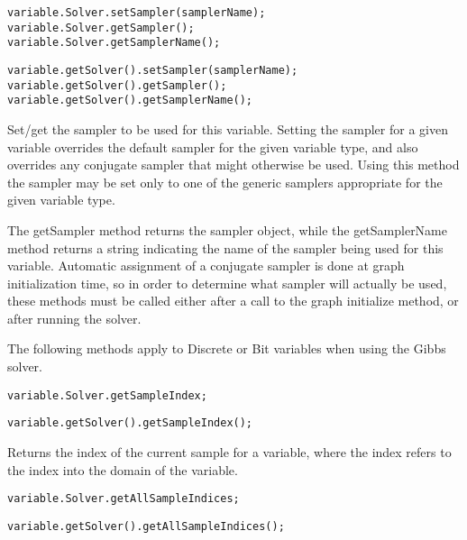 \ifmatlab
\begin{lstlisting}
variable.Solver.setSampler(samplerName);
variable.Solver.getSampler();
variable.Solver.getSamplerName();
\end{lstlisting}
\fi

\ifjava
\begin{lstlisting}
variable.getSolver().setSampler(samplerName);
variable.getSolver().getSampler();
variable.getSolver().getSamplerName();
\end{lstlisting}
\fi

Set/get the sampler to be used for this variable.  Setting the sampler for a given variable overrides the default sampler for the given variable type, and also overrides any conjugate sampler that might otherwise be used.  Using this method the sampler may be set only to one of the generic samplers appropriate for the given variable type.

The getSampler method returns the sampler object, while the getSamplerName method returns a string indicating the name of the sampler being used for this variable.  Automatic assignment of a conjugate sampler is done at graph initialization time, so in order to determine what sampler will actually be used, these methods must be called either after a call to the graph initialize method, or after running the solver.



The following methods apply to Discrete or Bit variables when using the Gibbs solver.

\ifmatlab
\begin{lstlisting}
variable.Solver.getSampleIndex;
\end{lstlisting}
\fi

\ifjava
\begin{lstlisting}
variable.getSolver().getSampleIndex();
\end{lstlisting}
\fi

Returns the index of the current sample for a variable, where the index refers to the index into the domain of the variable.

\ifmatlab
\begin{lstlisting}
variable.Solver.getAllSampleIndices;
\end{lstlisting}
\fi

\ifjava
\begin{lstlisting}
variable.getSolver().getAllSampleIndices();
\end{lstlisting}
\fi

